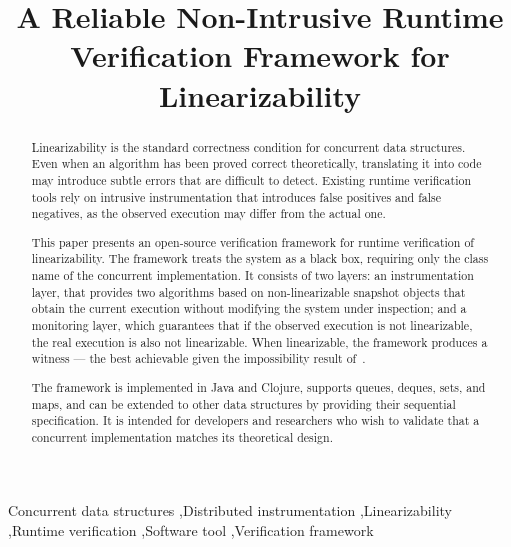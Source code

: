 \documentclass[preprint,12pt]{elsarticle}
\begin{document}
\begin{frontmatter}

\title{A Reliable Non-Intrusive Runtime Verification Framework for Linearizability}

\begin{abstract}
Linearizability is the standard correctness condition for concurrent data
structures. Even when an algorithm has been proved correct theoretically,
translating it into code may introduce subtle errors that are difficult to
detect. Existing runtime verification tools rely on intrusive instrumentation
that introduces false positives and false negatives, as the observed execution
may differ from the actual one.

This paper presents an open-source verification framework for runtime
verification of linearizability. The framework treats the system as a black
box, requiring only the class name of the concurrent implementation. It
consists of two layers: an instrumentation layer, that provides two
algorithms based on non-linearizable snapshot objects that obtain the current
execution without modifying the system under inspection; and a monitoring
layer, which guarantees that if the observed execution is not linearizable,
the real execution is also not linearizable. When linearizable, the framework
produces a witness --- the best achievable given the impossibility
result of~\cite{CR23}.

The framework is implemented in Java and Clojure, supports queues, deques,
sets, and maps, and can be extended to other data structures by providing
their sequential specification. It is intended for developers and researchers
who wish to validate that a concurrent implementation matches its theoretical
design. %
\end{abstract}

\begin{keyword}
 Concurrent data structures \sep Distributed
instrumentation \sep Linearizability \sep Runtime verification \sep Software tool \sep Verification framework 
\end{keyword}
\end{frontmatter}
\end{document}
